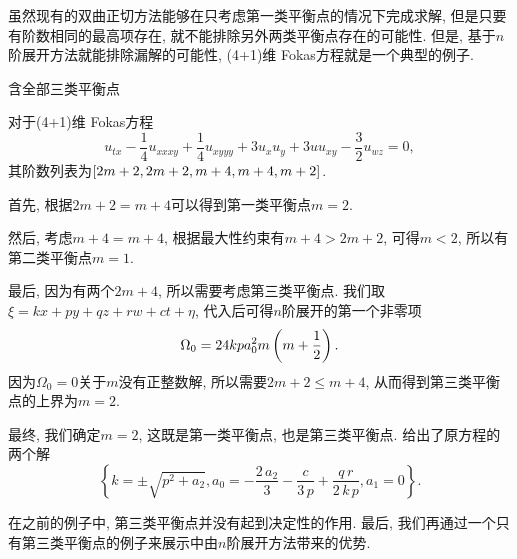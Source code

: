 虽然现有的双曲正切方法能够在只考虑第一类平衡点的情况下完成求解, 但是只要有阶数相同的最高项存在, 就不能排除另外两类平衡点存在的可能性. 但是, 基于$n$阶展开方法就能排除漏解的可能性, (4+1)维 Fokas方程就是一个典型的例子.

\begin{example}含全部三类平衡点

对于(4+1)维 Fokas方程\CITEdaFokas{}
\begin{equation}
    u_{tx}-\frac{1}{4}u_{xxxy}+\frac{1}{4}u_{xyyy}+3u_xu_y+3uu_{xy}-\frac{3}{2}u_{wz}=0 ,
\end{equation}
其阶数列表为$\left[2m+2,2m+2,m+4,m+4,m+2\right]$. 
\begin{compactitem}[\textbullet]
\item 首先, 根据$2m+2=m+4$可以得到第一类平衡点$m=2$.
\item 然后, 考虑$m+4=m+4$, 根据最大性约束有$m+4>2m+2$, 可得$m<2$, 所以有第二类平衡点$m=1$.
\item 最后, 因为有两个$2m+4$, 所以需要考虑第三类平衡点. 我们取$\xi=kx+py+qz+rw+ct+\eta$, 代入后可得$n$阶展开的第一个非零项
\begin{equation}
    \Omega_0 = 24kpa_0^2m\left(m+\frac{1}{2}\right). 
\end{equation}
因为$\Omega_0=0$关于$m$没有正整数解, 所以需要$2m+2\le m+4$, 从而得到第三类平衡点的上界为$m=2$.
\end{compactitem}
   
最终, 我们确定$m=2$, 这既是第一类平衡点, 也是第三类平衡点. 给出了原方程的两个解
\begin{equation}
    \left\{ k=\pm \sqrt {{p}^{2}+{{a}_{2}}},{{a}_{0}}=-\frac{2\,{{a}_{2}}}{3}-\frac{c}{3\,p}+ \frac{q\,r}{2\,k\,p},{{a}_{1}}=0\right\} .
\end{equation}
\end{example}

在之前的例子中, 第三类平衡点并没有起到决定性的作用. 最后, 我们再通过一个只有第三类平衡点的例子来展示中由$n$阶展开方法带来的优势.

